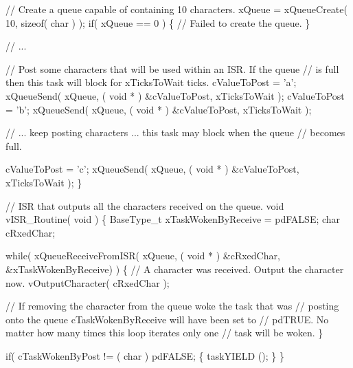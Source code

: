 \begin{DoxyPre}   // Create a queue capable of containing 10 characters.
   xQueue = xQueueCreate( 10, sizeof( char ) );
   if( xQueue == 0 )
   \{
    // Failed to create the queue.
   \}\end{DoxyPre}



\begin{DoxyPre}   // ...\end{DoxyPre}



\begin{DoxyPre}   // Post some characters that will be used within an ISR.  If the queue
   // is full then this task will block for xTicksToWait ticks.
   cValueToPost = 'a';
   xQueueSend( xQueue, ( void * ) \&cValueToPost, xTicksToWait );
   cValueToPost = 'b';
   xQueueSend( xQueue, ( void * ) \&cValueToPost, xTicksToWait );\end{DoxyPre}



\begin{DoxyPre}   // ... keep posting characters ... this task may block when the queue
   // becomes full.\end{DoxyPre}



\begin{DoxyPre}   cValueToPost = 'c';
   xQueueSend( xQueue, ( void * ) \&cValueToPost, xTicksToWait );
\}\end{DoxyPre}



\begin{DoxyPre}// ISR that outputs all the characters received on the queue.
void vISR\_Routine( void )
\{
BaseType\_t xTaskWokenByReceive = pdFALSE;
char cRxedChar;\end{DoxyPre}



\begin{DoxyPre}   while( xQueueReceiveFromISR( xQueue, ( void * ) \&cRxedChar, \&xTaskWokenByReceive) )
   \{
    // A character was received.  Output the character now.
    vOutputCharacter( cRxedChar );\end{DoxyPre}



\begin{DoxyPre}    // If removing the character from the queue woke the task that was
    // posting onto the queue cTaskWokenByReceive will have been set to
    // pdTRUE.  No matter how many times this loop iterates only one
    // task will be woken.
   \}\end{DoxyPre}



\begin{DoxyPre}   if( cTaskWokenByPost != ( char ) pdFALSE;
   \{
    taskYIELD ();
   \}
\}
\end{DoxyPre}
 